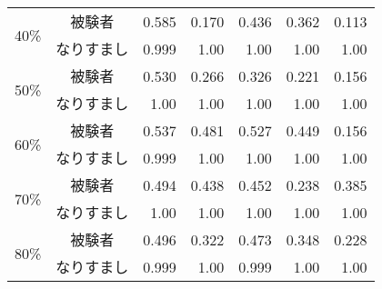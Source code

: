 \begin{center}
\begin{longtable}[btph]{|c|c|r|r|r|r|r|}
      \multirow{2}{*}{40\%} & 被験者 & 0.585 & 0.170 & 0.436 & 0.362 & 0.113 \\ \cline{2-7}
           & なりすまし & 0.999 & 1.00 & 1.00 & 1.00 & 1.00 \\ \hline
      \multirow{2}{*}{50\%} & 被験者 & 0.530 & 0.266 & 0.326 & 0.221 & 0.156 \\ \cline{2-7}
           & なりすまし & 1.00 & 1.00 & 1.00 & 1.00 & 1.00 \\ \hline
      \multirow{2}{*}{60\%} & 被験者 & 0.537 & 0.481 & 0.527 & 0.449 & 0.156 \\ \cline{2-7}
           & なりすまし & 0.999 & 1.00 & 1.00 & 1.00 & 1.00 \\ \hline
      \multirow{2}{*}{70\%} & 被験者 & 0.494 & 0.438  & 0.452 & 0.238 & 0.385 \\ \cline{2-7}
           & なりすまし & 1.00 & 1.00 & 1.00 & 1.00 & 1.00 \\ \hline
      \multirow{2}{*}{80\%} & 被験者 & 0.496 & 0.322 & 0.473 & 0.348  & 0.228 \\ \cline{2-7}
           & なりすまし & 0.999 & 1.00 & 0.999 & 1.00 & 1.00 \\ \hline

\end{longtable}
\end{center}
